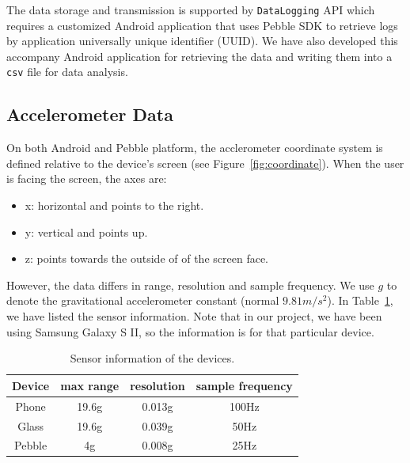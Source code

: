 The data storage and transmission is supported by \texttt{DataLogging} API which requires a customized Android application that uses Pebble SDK to retrieve logs by application universally unique identifier (UUID). We have also developed this accompany Android application for retrieving the data and writing them into a \texttt{csv} file for data analysis.

\subsection{Accelerometer Data}
\label{sec:accelerometer-axes}

On both Android and Pebble platform, the acclerometer coordinate system is defined relative to the device's screen (see Figure~\ref{fig:coordinate}). When the user is facing the screen, the axes are:
\begin{itemize}
\item x: horizontal and points to the right.
\item y: vertical and points up.
\item z: points towards the outside of of the screen face.
\end{itemize}

 


However, the data differs in range, resolution and sample frequency. We use $g$ to denote the gravitational accelerometer constant (normal $9.81 m/s^2$). In Table~\ref{tab:sensorinfo}, we have listed the sensor information. Note that in our project, we have been using Samsung Galaxy S II, so the information is for that particular device. 

\begin{table}
  \centering
  \begin{tabular}{c|c|c|c}
    \hline
    Device & max range & resolution & sample frequency \\
    \hline
    Phone  & 19.6g     & 0.013g     & 100Hz  \\
    Glass  & 19.6g     & 0.039g     & 50Hz   \\
    Pebble & 4g        & 0.008g     & 25Hz   \\
    \hline
  \end{tabular}
  \caption{Sensor information of the devices.}
  \label{tab:sensorinfo}
\end{table}

